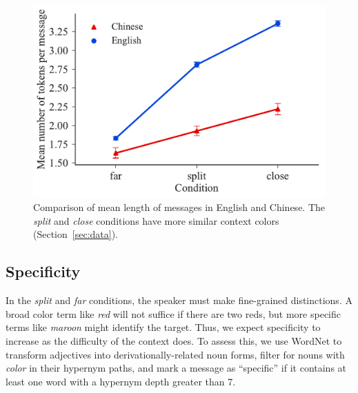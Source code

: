 \documentclass[11pt,a4paper]{article}
\renewcommand{\|}{\mid}
\newcommand{\word}[1]{\emph{#1}}
\newcommand{\secref}[1]{Section~\ref{#1}}
\begin{document}
\begin{figure}[!t]
    \centering

    \includegraphics[width=0.8\columnwidth]{tokens.pdf}
\caption{Comparison of mean length of messages in English and Chinese. The \emph{split} and \emph{close} conditions have more similar context colors (\secref{sec:data}).}
\label{fig:length}
\end{figure}




\subsection{Specificity}

In the \emph{split} and \emph{far} conditions, the speaker must make fine-grained distinctions. A broad color term like \word{red} will not suffice if there are two reds, but more specific terms like \word{maroon} might identify the target. Thus, we expect specificity to increase as the difficulty of the context does. To assess this, we use WordNet \citep{WordNet98} to transform adjectives into derivationally-related noun forms, filter for nouns with \word{color} in their hypernym paths, and mark a message as ``specific'' if it contains at least one word with a hypernym depth greater than 7.
\end{document}
